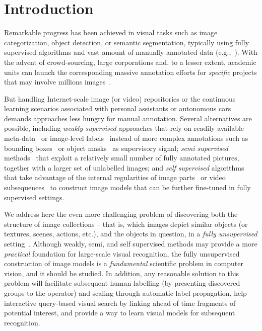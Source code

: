 \documentclass[10pt,twocolumn,letterpaper]{article}
\numberwithin{theorem}{section}
\begin{document}
\section{Introduction}
Remarkable progress has been achieved in visual
tasks such as image categorization, object detection, or semantic
segmentation, typically using fully supervised algorithms and vast
amount of manually annotated data
(e.g.,~\cite{felzenszwalb2010object,He17,He16,krizhevsky2012imagenet,Lazebnik2006,Ren15,Imagenet15}).
With the advent of crowd-sourcing, large corporations and, to a lesser
extent, academic units can launch the corresponding massive annotation
efforts for {\em specific} projects that may involve
millions images~\cite{Imagenet15}.  

But handling Internet-scale image (or video) repositories or the
continuous learning scenarios associated with personal assistants or
autonomous cars demands approaches less hungry for manual annotation.
Several alternatives are possible, including {\em weakly supervised}
approaches that rely on readily available
meta-data~\cite{Alayrac2018,Bojanowski2015} or image-level
labels~\cite{Deselaers:2010he,Joulin2010,Joulin14,Kim2011,Rubinstein2013,Tang14}
instead of more complex annotations such as bounding boxes~\cite{felzenszwalb2010object,Ren15} or
object masks~\cite{He17} as supervisory signal; {\em semi supervised}
methods~\cite{belkin2004regularization,kingma2014semi} that exploit a relatively small number of fully annotated pictures, together with a larger set of unlabelled
images; and {\em self supervised} algorithms that take advantage of
the internal regularities of image parts~\cite{DoGuEf15,NoFa16} or
video subsequences~\cite{AgCaMa15,MaCoLC16,WaGu15} to construct image
models that can be further fine-tuned in fully supervised settings. 

We address here the even more challenging problem of discovering both the
structure of image collections -- that is, which images depict similar objects (or textures, scenes, actions, etc.), and the objects
in question, in a {\em fully unsupervised}
setting~\cite{BoJo17,Caron18,faktor2012clustering,CVPR/LeeG10,Rubinstein2013,Russell06,sivic2008unsupervised}. Although
weakly, semi, and self supervised methods may provide a more {\em
  practical} foundation for large-scale visual recognition, the
fully unsupervised construction of image models is a {\em fundamental}
scientific problem in computer vision, and it should be studied. In
addition, any reasonable solution to this problem will facilitate
subsequent human labelling (by presenting discovered groups to
the operator) and scaling through automatic label
propagation, help interactive query-based visual search by linking
ahead of time fragments of potential interest, and provide a way to
learn visual models for subsequent recognition.
\end{document}
